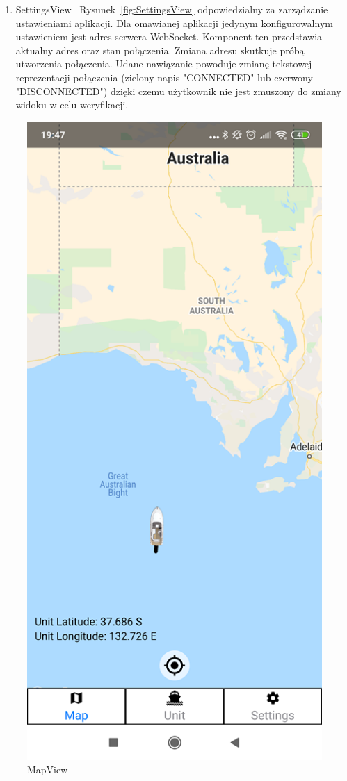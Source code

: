 \documentclass[skorowidz,skroty]{dyplomWEZUT}
\begin{document}
\begin{enumerate}
\item SettingsView ~Rysunek~\ref{fig:SettingsView} odpowiedzialny za zarządzanie ustawieniami aplikacji. Dla omawianej aplikacji jedynym konfigurowalnym ustawieniem jest adres serwera WebSocket. Komponent ten przedstawia aktualny adres oraz stan połączenia. Zmiana adresu skutkuje próbą utworzenia połączenia. Udane nawiązanie powoduje zmianę tekstowej reprezentacji połączenia (zielony napis "CONNECTED" lub czerwony "DISCONNECTED") dzięki czemu użytkownik nie jest zmuszony do zmiany widoku w celu weryfikacji. 
	 
\end{enumerate}


\begin{figure}[H]
  \centering
    \includegraphics[scale=0.2]{graphic/MapView}
    \caption{MapView}
    \label{fig:MapView}
\end{figure}
\end{document}
